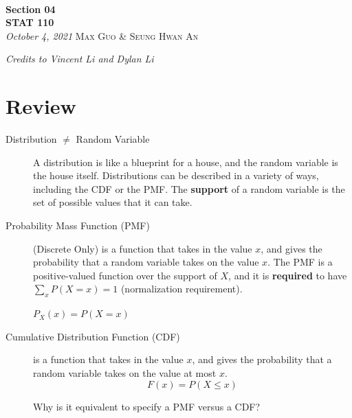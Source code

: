 \documentclass[11pt]{article}
\theoremstyle{definition}
\theoremstyle{remark}
\newcommand{\inserttitle}{Section 04}
\newcommand{\insertauthor}{Max Guo \& Seung Hwan An}
\newcommand{\insertcourse}{STAT 110}
\begin{document}
{\noindent\Huge\bf  \\[0.1\baselineskip] {\inserttitle }}\\[2\baselineskip]
{{\bf \insertcourse}\\ {\textit{October 4, 2021}}} \hfill {\large \textsc{\insertauthor}}
\smallskip

\hfill \noindent \textit{Credits to Vincent Li and Dylan Li}

\section{Review}
\begin{description}

\item[Distribution $\neq$ Random Variable] A distribution is like a blueprint for a house, and the random variable is the house itself. Distributions can be described in a variety of ways, including the CDF or the PMF. The \textbf{support} of a random variable is the set of possible values that it can take.

\item[Probability Mass Function (PMF)] (Discrete Only) is a function that takes in the value $x$, and gives the probability that a random variable takes on the value $x$. The PMF is a positive-valued function over the support of $X$, and it is \textbf{required} to have $\sum_xP(X=x) = 1$ (normalization requirement).
\begin{center}
$P_X(x) = P(X=x)$
\end{center}

\item[Cumulative Distribution Function (CDF)] is a function that takes in the value $x$, and gives the probability that a random variable takes on the value at most $x$.
\[F(x) = P(X \leq x)\]

Why is it equivalent to specify a PMF versus a CDF?

\bigskip

\end{description}
\end{document}
